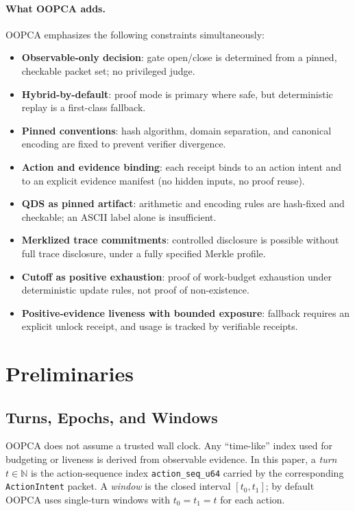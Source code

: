 \documentclass[11pt]{article}
\begin{document}
\paragraph{What OOPCA adds.}
OOPCA emphasizes the following constraints simultaneously:
\begin{itemize}[leftmargin=1.2em]
  \item \textbf{Observable-only decision}: gate open/close is determined from a pinned, checkable packet set; no privileged judge.
  \item \textbf{Hybrid-by-default}: proof mode is primary where safe, but deterministic replay is a first-class fallback.
  \item \textbf{Pinned conventions}: hash algorithm, domain separation, and canonical encoding are fixed to prevent verifier divergence.
  \item \textbf{Action and evidence binding}: each receipt binds to an action intent and to an explicit evidence manifest (no hidden inputs, no proof reuse).
  \item \textbf{QDS as pinned artifact}: arithmetic and encoding rules are hash-fixed and checkable; an ASCII label alone is insufficient.
  \item \textbf{Merklized trace commitments}: controlled disclosure is possible without full trace disclosure, under a fully specified Merkle profile.
  \item \textbf{Cutoff as positive exhaustion}: proof of work-budget exhaustion under deterministic update rules, not proof of non-existence.
  \item \textbf{Positive-evidence liveness with bounded exposure}: fallback requires an explicit unlock receipt, and usage is tracked by verifiable receipts.
\end{itemize}

\section{Preliminaries}\label{sec:prelim}

\subsection{Turns, Epochs, and Windows}

OOPCA does not assume a trusted wall clock. Any ``time-like'' index used for budgeting or liveness is derived from observable evidence.
In this paper, a \emph{turn} $t\in\mathbb{N}$ is the action-sequence index \texttt{action\_seq\_u64} carried by the corresponding \texttt{ActionIntent} packet.
A \emph{window} is the closed interval $[t_0,t_1]$; by default OOPCA uses single-turn windows with $t_0=t_1=t$ for each action.
\end{document}
